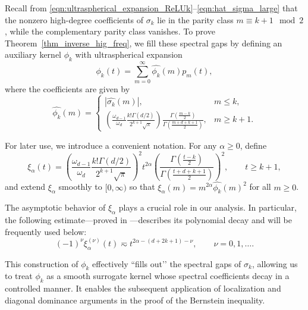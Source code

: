 \documentclass{article}
\numberwithin{equation}{section}
\def\sul{\sum\limits}
\begin{document}
Recall from \eqref{eqn:ultraspherical_expansion_ReLUk}--\eqref{eqn:hat_sigma_large} that the nonzero high-degree coefficients of $\sigma_k$ lie in the parity class $m\equiv k+1\mod 2$, while the complementary parity class vanishes. To prove Theorem~\ref{thm_inverse_hig_freq}, we fill these spectral gaps by defining an auxiliary kernel $\phi_k$ with ultraspherical expansion
\begin{equation}
    \phi_k(t)=\sul_{m=0}^\infty\widehat{\phi_k}(m)p_m(t),
\end{equation}
where the coefficients are given by
\begin{equation}\label{eqn:def_phi_k}
    \widehat{\phi_k}(m)
    =\left\{\begin{array}{ll}
    |\widehat{\sigma_k}(m)|, & m\leq k,  \\[0.3em]
    \displaystyle
    \left(\frac{\omega_{d-1}}{\omega_d}
           \frac{k!\Gamma(d/2)}{2^{k+1}\sqrt{\pi}}\right)
    \frac{\Gamma\!\left(\frac{m-k}{2}\right)}
         {\Gamma\!\left(\frac{m+d+k+1}{2}\right)}, & m\geq k+1.
\end{array}\right.
\end{equation}

\medskip
For later use, we introduce a convenient notation. 
For any $\alpha\ge0$, define
\begin{equation}\label{eqn:theta}
    \xi_\alpha(t)
    =\left(\frac{\omega_{d-1}}{\omega_d}
            \frac{k!\Gamma(d/2)}{2^{k+1}\sqrt{\pi}}\right)^2
      t^{2\alpha}
      \left(\frac{\Gamma\!\left(\frac{t-k}{2}\right)}
                 {\Gamma\!\left(\frac{t+d+k+1}{2}\right)}\right)^2,
      \qquad t\ge k+1,
\end{equation}
and extend $\xi_\alpha$ smoothly to $[0,\infty)$ so that $\xi_\alpha(m)=m^{2\alpha}\widehat{\phi_k}(m)^2$ for all $m\ge 0$.

The asymptotic behavior of $\xi_\alpha$ plays a crucial role in our analysis. 
In particular, the following estimate—proved in \cite[Lemma~3.1]{liu2025integral}—describes its polynomial decay and will be frequently used below:
\begin{equation}\label{eqn_xi_decay}
    (-1)^\nu\xi_\alpha^{(\nu)}(t)\eqsim 
    t^{2\alpha-(d+2k+1)-\nu},\qquad \nu=0,1,\dots.
\end{equation}

\medskip
This construction of $\phi_k$ effectively “fills out’’ the spectral gaps of $\sigma_k$, 
allowing us to treat $\phi_k$ as a smooth surrogate kernel whose spectral coefficients decay in a controlled manner. 
It enables the subsequent application of localization and diagonal dominance arguments in the proof of the Bernstein inequality.
\end{document}
